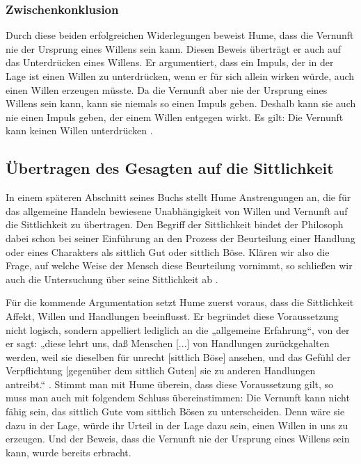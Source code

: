 \documentclass[ngerman,12pt]{diazessay} %
\begin{document}
\begin{doublespace}
\subsubsection{Zwischenkonklusion}
Durch diese beiden erfolgreichen Widerlegungen beweist Hume, dass die Vernunft nie der Ursprung eines Willens sein kann. Diesen Beweis überträgt er auch auf das Unterdrücken eines Willens. Er argumentiert, dass ein Impuls, der in der Lage ist einen Willen zu unterdrücken, wenn er für sich allein wirken würde, auch einen Willen erzeugen müsste. Da die Vernunft aber nie der Ursprung eines Willens sein kann, kann sie niemals so einen Impuls geben. Deshalb kann sie auch nie einen Impuls geben, der einem Willen entgegen wirkt. Es gilt: Die Vernunft kann keinen Willen unterdrücken \cite[S.486]{Hume.2013}. 

\subsection{Übertragen des Gesagten auf die Sittlichkeit}
In einem späteren Abschnitt seines Buchs stellt Hume Anstrengungen an, die für das allgemeine Handeln bewiesene Unabhängigkeit von Willen und Vernunft auf die Sittlichkeit zu übertragen. Den Begriff der Sittlichkeit bindet der Philosoph dabei schon bei seiner Einführung an den Prozess der Beurteilung einer Handlung oder eines Charakters als sittlich Gut oder sittlich Böse. Klären wir also die Frage, auf welche Weise der Mensch diese Beurteilung vornimmt, so schließen wir auch die Untersuchung über seine Sittlichkeit ab \cite[siehe S.532]{Hume.2013}.
\par\bigskip   
Für die kommende Argumentation setzt Hume zuerst voraus, dass die Sittlichkeit Affekt, Willen und Handlungen beeinflusst. Er begründet diese Voraussetzung nicht logisch, sondern appelliert lediglich an die „allgemeine Erfahrung“, von der er sagt: „diese lehrt uns, daß Menschen [...] von Handlungen zurückgehalten
werden, weil sie dieselben für unrecht [sittlich Böse] ansehen, und das Gefühl
der Verpflichtung [gegenüber dem sittlich Guten] sie zu anderen Handlungen antreibt.“ \cite[S.533]{Hume.2013}. Stimmt man mit Hume überein, dass diese Voraussetzung gilt, so muss man auch mit folgendem Schluss übereinstimmen: Die Vernunft kann nicht fähig sein, das sittlich Gute vom sittlich Bösen zu unterscheiden. Denn wäre sie dazu in der Lage, würde ihr Urteil in der Lage dazu sein, einen Willen in uns zu erzeugen. Und der Beweis, dass die Vernunft nie der Ursprung eines Willens sein kann, wurde bereits erbracht.


\end{doublespace}
\end{document}
